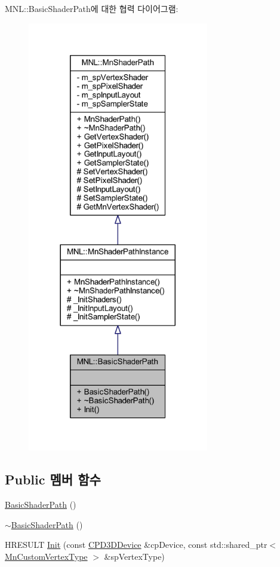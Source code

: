 M\+NL\+:\+:Basic\+Shader\+Path에 대한 협력 다이어그램\+:\nopagebreak
\begin{figure}[H]
\begin{center}
\leavevmode
\includegraphics[width=224pt]{class_m_n_l_1_1_basic_shader_path__coll__graph}
\end{center}
\end{figure}
\subsection*{Public 멤버 함수}
\begin{DoxyCompactItemize}
\item 
\hyperlink{class_m_n_l_1_1_basic_shader_path_ae8908353c46de6669022661239c84b74}{Basic\+Shader\+Path} ()
\item 
\hyperlink{class_m_n_l_1_1_basic_shader_path_aa416c14988fdff0ecd7937bcec255ef7}{$\sim$\+Basic\+Shader\+Path} ()
\item 
H\+R\+E\+S\+U\+LT \hyperlink{class_m_n_l_1_1_basic_shader_path_a5600873eea14db77383ef1781c393aa9}{Init} (const \hyperlink{namespace_m_n_l_a1eec210db8f309a4a9ac0d9658784c31}{C\+P\+D3\+D\+Device} \&cp\+Device, const std\+::shared\+\_\+ptr$<$ \hyperlink{class_m_n_l_1_1_mn_custom_vertex_type}{Mn\+Custom\+Vertex\+Type} $>$ \&sp\+Vertex\+Type)
\end{DoxyCompactItemize}
